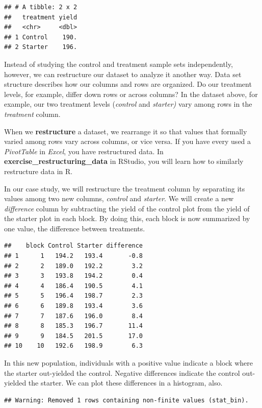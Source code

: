 \documentclass[
]{book}
\begin{document}
\begin{verbatim}
## # A tibble: 2 x 2
##   treatment yield
##   <chr>     <dbl>
## 1 Control    190.
## 2 Starter    196.
\end{verbatim}

Instead of studying the control and treatment sample sets independently,
however, we can restructure our dataset to analyze it another way. Data
set structure describes how our columns and rows are organized. Do our
treatment levels, for example, differ down rows or across columns? In
the dataset above, for example, our two treatment levels (\emph{control} and
\emph{starter)} vary among rows in the \emph{treatment} column.

When we \textbf{restructure} a dataset, we rearrange it so that values that
formally varied among rows vary across columns, or vice versa. If you
have every used a \emph{PivotTable} in \emph{Excel}, you have restructured data.
In \textbf{exercise\_restructuring\_data} in RStudio, you will learn how to
similarly restructure data in R.

In our case study, we will restructure the treatment column by
separating its values among two new columns, \emph{control} and \emph{starter}. We
will create a new \emph{difference} column by subtracting the yield of the
control plot from the yield of the starter plot in each block. By doing
this, each block is now summarized by one value, the difference between
treatments.

\begin{verbatim}
##    block Control Starter difference
## 1      1   194.2   193.4       -0.8
## 2      2   189.0   192.2        3.2
## 3      3   193.8   194.2        0.4
## 4      4   186.4   190.5        4.1
## 5      5   196.4   198.7        2.3
## 6      6   189.8   193.4        3.6
## 7      7   187.6   196.0        8.4
## 8      8   185.3   196.7       11.4
## 9      9   184.5   201.5       17.0
## 10    10   192.6   198.9        6.3
\end{verbatim}

In this new population, individuals with a positive value indicate a
block where the starter out-yielded the control. Negative differences
indicate the control out-yielded the starter. We can plot these
differences in a histogram, also.

\begin{verbatim}
## Warning: Removed 1 rows containing non-finite values (stat_bin).
\end{verbatim}
\end{document}
